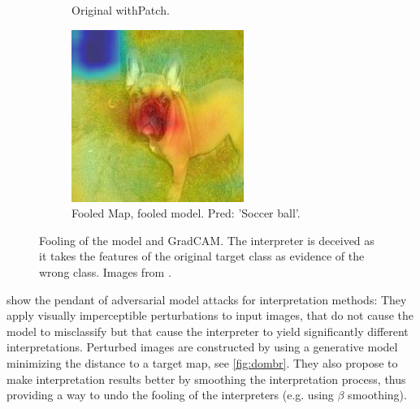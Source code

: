 \begin{figure}[ht]
\begin{subfigure}{0.32\linewidth}
      \caption{\scriptsize{Original with\newline Patch.}}
      \label{fig:patch_plus_dog}
    \end{subfigure}
    \begin{subfigure}{0.32\linewidth}
      \includegraphics[width=\linewidth]{figures/patch_fooled.png}
      \caption{\scriptsize{Fooled Map, fooled \newline model. Pred: 'Soccer ball'.}}
      \label{fig:patch_fooled}
    \end{subfigure}
    \caption{Fooling of the model and GradCAM. The interpreter is deceived as it takes the features of the original target class as evidence of the wrong class. Images from \cite{subramanya2019fooling}.}\label{fig:patch_fooling}
    \vspace{-0.3cm}
\end{figure}

\cite{dombrowski2019explanations} show the pendant of adversarial model attacks for interpretation methods: They apply visually imperceptible perturbations to input images, that do not cause the model to misclassify but that cause the interpreter to yield significantly different interpretations. Perturbed images are constructed by using a generative model minimizing the distance to a target map, see \autoref{fig:dombr}. They also propose to make interpretation results better by smoothing the interpretation process, thus providing a way to undo the fooling of the interpreters (e.g. using $\beta$ smoothing).

